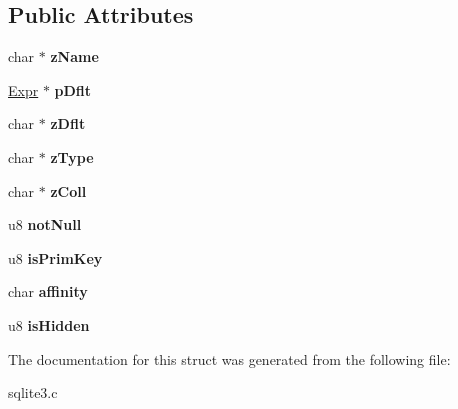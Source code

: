 \subsection*{Public Attributes}
\begin{DoxyCompactItemize}
\item 
\hypertarget{struct_column_a6450a4e9fde68b3a2d79425d826eccc3}{char $\ast$ {\bfseries z\-Name}}\label{struct_column_a6450a4e9fde68b3a2d79425d826eccc3}

\item 
\hypertarget{struct_column_ac4178f302df70048235660979f84ffe4}{\hyperlink{struct_expr}{Expr} $\ast$ {\bfseries p\-Dflt}}\label{struct_column_ac4178f302df70048235660979f84ffe4}

\item 
\hypertarget{struct_column_a88d29c685783cddfbd039e5674990f4b}{char $\ast$ {\bfseries z\-Dflt}}\label{struct_column_a88d29c685783cddfbd039e5674990f4b}

\item 
\hypertarget{struct_column_aef09f43479c4bd2d07f77d340020f95f}{char $\ast$ {\bfseries z\-Type}}\label{struct_column_aef09f43479c4bd2d07f77d340020f95f}

\item 
\hypertarget{struct_column_aa95909d5c77b321258622ed28d7b96eb}{char $\ast$ {\bfseries z\-Coll}}\label{struct_column_aa95909d5c77b321258622ed28d7b96eb}

\item 
\hypertarget{struct_column_a852e9a4c1c327a64d9b051dcafda3841}{u8 {\bfseries not\-Null}}\label{struct_column_a852e9a4c1c327a64d9b051dcafda3841}

\item 
\hypertarget{struct_column_a57a53c2c60925a1ce5fdfe8fa3ccd62a}{u8 {\bfseries is\-Prim\-Key}}\label{struct_column_a57a53c2c60925a1ce5fdfe8fa3ccd62a}

\item 
\hypertarget{struct_column_ac9d6fe31c45888cecaf3f5ad5b93bf23}{char {\bfseries affinity}}\label{struct_column_ac9d6fe31c45888cecaf3f5ad5b93bf23}

\item 
\hypertarget{struct_column_aafdb39efd9b21476415c5beeb5a8b180}{u8 {\bfseries is\-Hidden}}\label{struct_column_aafdb39efd9b21476415c5beeb5a8b180}

\end{DoxyCompactItemize}


The documentation for this struct was generated from the following file\-:\begin{DoxyCompactItemize}
\item 
sqlite3.\-c\end{DoxyCompactItemize}
